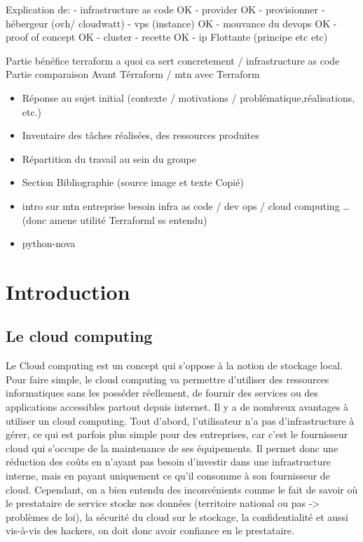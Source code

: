 \documentclass[]{article}
\date{}
\begin{document}
Explication de: - infrastructure as code OK - provider OK - provisionner
- hébergeur (ovh/ cloudwatt) - vps (instance) OK - mouvance du devops OK
- proof of concept OK - cluster - recette OK - ip Flottante (principe
etc etc)

Partie bénéfice terraform a quoi ca sert concretement / infrastructure
as code Partie comparaison Avant Térraform / mtn avec Terraform

\begin{itemize}
\item
  Réponse au sujet initial (contexte / motivations /
  problématique,réalisations, etc.)
\item
  Inventaire des tâches réalisées, des ressources produites
\item
  Répartition du travail au sein du groupe
\item
  Section Bibliographie (source image et texte Copié)
\item
  intro sur mtn entreprise besoin infra as code / dev ops / cloud
  computing \ldots{} (donc amene utilité Terraforml ss entendu)
\item
  python-nova
\end{itemize}

\section{Introduction}\label{introduction}

\subsection{Le cloud computing}\label{le-cloud-computing}

Le Cloud computing est un concept qui s'oppose à la notion de stockage
local. Pour faire simple, le cloud computing va permettre d'utiliser des
ressources informatiques sans les posséder réellement, de fournir des
services ou des applications accessibles partout depuis internet. Il y a
de nombreux avantages à utiliser un cloud computing. Tout d'abord,
l'utilisateur n'a pas d'infrastructure à gérer, ce qui est parfois plus
simple pour des entreprises, car c'est le fournisseur cloud qui s'occupe
de la maintenance de ses équipements. Il permet donc une réduction des
coûts en n'ayant pas besoin d'investir dans une infrastructure interne,
mais en payant uniquement ce qu'il consomme à son fournisseur de cloud.
Cependant, on a bien entendu des inconvénients comme le fait de savoir
où le prestataire de service stocke nos données (territoire national ou
pas -\textgreater{} problèmes de loi), la sécurité du cloud sur le
stockage, la confidentialité et aussi vis-à-vis des hackers, on doit
donc avoir confiance en le prestataire.
\end{document}
